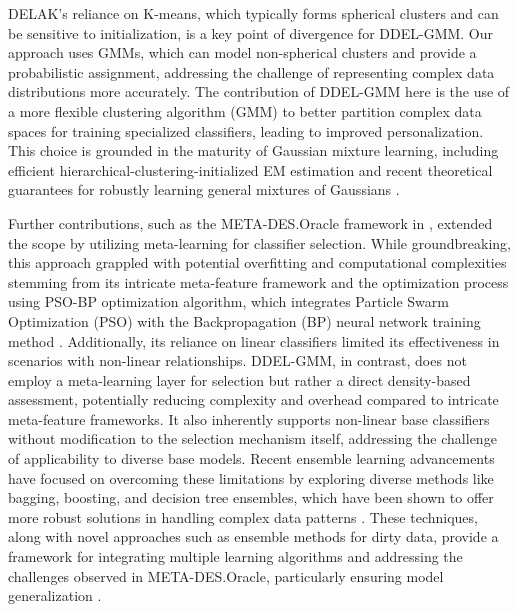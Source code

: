 \documentclass[lettersize,journal]{IEEEtran}
\newcommand{\greenhighlight}[1]{\textcolor{highlightgreen}{#1}}
\begin{document}
\greenhighlight{DELAK's reliance on K-means, which typically forms spherical clusters and can be sensitive to initialization, is a key point of divergence for DDEL-GMM. Our approach uses GMMs, which can model non-spherical clusters and provide a probabilistic assignment, addressing the challenge of representing complex data distributions more accurately. The contribution of DDEL-GMM here is the use of a more flexible clustering algorithm (GMM) to better partition complex data spaces for training specialized classifiers, leading to improved personalization. This choice is grounded in the maturity of Gaussian mixture learning, including efficient hierarchical-clustering-initialized EM estimation \cite{li_gaussian_2018} and recent theoretical guarantees for robustly learning general mixtures of Gaussians \cite{liu_robustly_2023}.}

Further contributions, such as the META-DES.Oracle framework in \cite{cruz_meta-oracle_2017}, extended the scope by utilizing meta-learning for classifier selection. While groundbreaking, this approach grappled with potential overfitting and computational complexities stemming from its intricate meta-feature framework and the optimization process using PSO-BP optimization algorithm, which integrates Particle Swarm Optimization (PSO) with the Backpropagation (BP) neural network training method \cite{al-andoli_ensemble-based_2023}. Additionally, its reliance on linear classifiers limited its effectiveness in scenarios with non-linear relationships. \greenhighlight{DDEL-GMM, in contrast, does not employ a meta-learning layer for selection but rather a direct density-based assessment, potentially reducing complexity and overhead compared to intricate meta-feature frameworks. It also inherently supports non-linear base classifiers without modification to the selection mechanism itself, addressing the challenge of applicability to diverse base models.} Recent ensemble learning advancements have focused on overcoming these limitations by exploring diverse methods like bagging, boosting, and decision tree ensembles, which have been shown to offer more robust solutions in handling complex data patterns \cite{sagi_ensemble_2018}. These techniques, along with novel approaches such as ensemble methods for dirty data, provide a framework for integrating multiple learning algorithms and addressing the challenges observed in META-DES.Oracle, particularly ensuring model generalization \cite{liu_ensemble_2023}.
\end{document}
